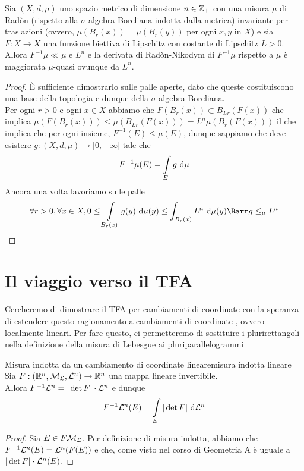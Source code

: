 \documentclass{article}
\begin{document}
\begin{proposition}{}{}
    Sia $(X,d,\mu)$ uno spazio metrico di dimensione $n \in \mathbb{Z}_+$ con una misura $\mu$ di Radòn (rispetto alla $\sigma$-algebra Boreliana indotta dalla metrica) invariante per traslazioni (ovvero, $\mu(B_r(x)) = \mu(B_r(y))$ per ogni $x,y$ in $X$) e sia $F:X \to X$ una funzione biettiva di Lipschitz con costante di Lipschitz $L>0$.\\
    Allora $F^{-1}\mu \ll \mu$ e $L^n$ e la derivata di Radòn-Nikodym di $F^{-1}\mu$ rispetto a $\mu$ è maggiorata $\mu$-quasi ovunque da $L^n$.
    \begin{proof}
        È sufficiente dimostrarlo sulle palle aperte, dato che queste costituiscono una base della topologia e dunque della $\sigma$-algebra Boreliana.\\
        Per ogni $r>0$ e ogni $x \in X$ abbiamo che  $F(B_r(x)) \subset B_{Lr}(F(x))$ che implica $\mu(F(B_r(x)))\le \mu(B_{Lr}(F(x))) = L^n\mu(B_r(F(x)))$ il che implica che per ogni insieme, $F^{-1}(E) \le \mu(E)$, dunque sappiamo che deve esistere $g: (X,d,\mu)\to [0,+\infty[$ tale che
        \[F^{-1}\mu(E) = \int\limits_E g \text{ d} \mu\]
        Ancora una volta lavoriamo sulle palle
        \[\forall r>0,\forall x \in X, 0\le \int\limits_{B_r(x)} g(y)\de \mu(y) \le \int_{B_r(x)} L^n \de\mu(y) \Rarr g \le_\mu L^n \]
    \end{proof}
\end{proposition}

\section{Il viaggio verso il TFA}

Cercheremo di dimostrare il TFA per cambiamenti di coordinate  con la speranza di estendere questo ragionamento a cambiamenti di coordinate , ovvero localmente lineari. Per fare questo, ci permetteremo di sostituire i plurirettangoli nella definizione della misura di Lebesgue ai pluriparallelogrammi

\begin{lemma}{Misura indotta da un cambiamento di coordinate lineare}{misura indotta lineare}
    Sia $F: (\mathbb{R}^n, \mathcal{M}_{\mathcal{L}}, \mathcal{L}^n) \to \mathbb{R}^n$ una mappa lineare invertibile.\\
    Allora $F^{-1}\mathcal{L}^n = |\det F|\cdot \mathcal{L}^n$ e dunque
    \[F^{-1}\mathcal{L}^n(E) = \int\limits_E |\det F|\text{ d} \mathcal{L}^n\]
    \begin{proof}
        Sia $E \in F\mathcal{M}_{\mathcal{L}}$. Per definizione di misura indotta, abbiamo che $F^{-1}\mathcal{L}^n(E) = \mathcal{L}^n(F(E))$ e che, come visto nel corso di Geometria A è uguale a $|\det F|\cdot \mathcal{L}^n(E)$.
    \end{proof}
\end{lemma}
\end{document}

